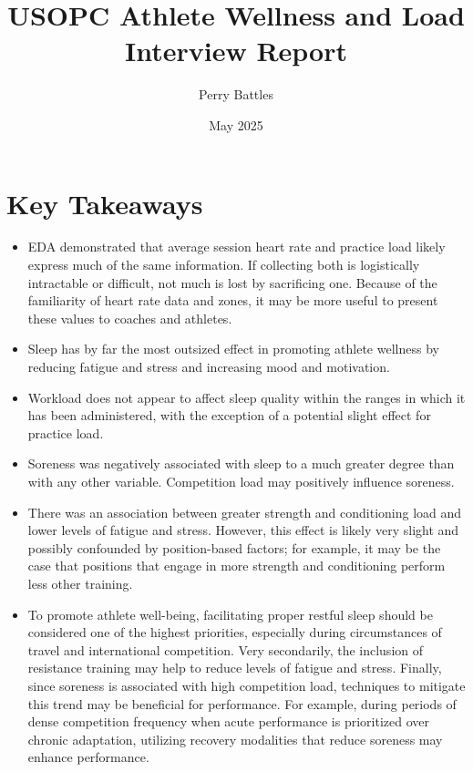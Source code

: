 \documentclass{article}
\title{USOPC Athlete Wellness and Load Interview Report}
\author{Perry Battles}
\date{May 2025}
\begin{document}
	\maketitle

	\section{Key Takeaways}

		\begin{itemize}
			\item EDA demonstrated that average session heart rate and
			practice load likely express much of the same information.
			If collecting both is logistically intractable or difficult,
			not much is lost by sacrificing one. Because of the familiarity
			of heart rate data and zones, it may be more useful to present
			these values to coaches and athletes.
			\item Sleep has by far the most outsized effect in promoting
			athlete wellness by reducing fatigue and stress and increasing
			mood and motivation.
			\item Workload does not appear to affect sleep quality within
			the ranges in which it has been administered, with the exception
			of a potential slight effect for practice load.
			\item Soreness was negatively associated with sleep to a much
			greater degree than with any other variable.
			Competition load may positively influence soreness.
			\item There was an association between greater
			strength and conditioning load and lower levels of fatigue
			and stress.
			However, this effect is likely very slight and possibly
			confounded by position-based factors; for example, it may be
			the case that positions that engage in more strength and
			conditioning perform less other training.
			\item To promote athlete well-being, facilitating proper
			restful sleep should be considered one of the highest priorities,
			especially during circumstances of travel and international
			competition. Very
			secondarily, the inclusion of resistance training may help to
			reduce levels of fatigue and stress. Finally, since soreness is
			associated with high competition load, techniques to mitigate
			this trend may be beneficial for performance. For example,
			during periods of dense competition frequency when acute
			performance is prioritized over chronic adaptation, utilizing
			recovery modalities that reduce soreness may enhance performance.
		\end{itemize}
\end{document}
